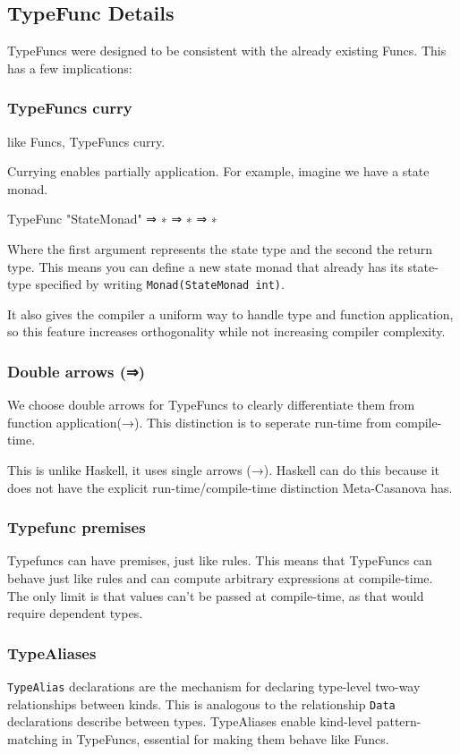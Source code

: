 \subsection{TypeFunc Details}
TypeFuncs were designed to be consistent with the already existing Funcs.
This has a few implications:

\subsubsection*{TypeFuncs curry}
like Funcs, TypeFuncs curry.

Currying enables partially application.
For example, imagine we have a state monad.

\begin{code}
  TypeFunc "StateMonad" ⇒ ∗ ⇒ ∗ ⇒ ∗
\end{code}

\noindent Where the first argument represents the state type and the second the return type.
This means you can define a new state monad that already has its state-type specified by writing \verb|Monad(StateMonad int)|.

It also gives the compiler a uniform way to handle type and function application,
so this feature increases orthogonality while not increasing compiler complexity.

\subsubsection*{Double arrows (⇒)}
We choose double arrows for TypeFuncs to clearly differentiate them from function application(→).
This distinction is to seperate run-time from compile-time.

This is unlike Haskell, it uses single arrows (→).
Haskell can do this because it does not have the explicit run-time/compile-time distinction Meta-Casanova has.

\subsubsection*{Typefunc premises}
Typefuncs can have premises, just like rules.
This means that TypeFuncs can behave just like rules and can compute arbitrary expressions at compile-time.
The only limit is that values can't be passed at compile-time, as that would require dependent types.

\subsubsection*{TypeAliases}
\texttt{TypeAlias} declarations are the mechanism for declaring type-level two-way relationships between kinds.
This is analogous to the relationship \texttt{Data} declarations describe between types.
TypeAliases enable kind-level pattern-matching in TypeFuncs, essential for making them behave like Funcs.
